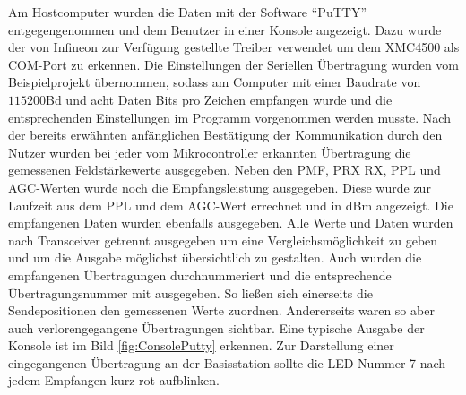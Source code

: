 Am Hostcomputer wurden die Daten mit der Software \enquote{PuTTY} entgegengenommen und dem Benutzer in einer Konsole angezeigt. Dazu wurde der von Infineon zur Verfügung gestellte Treiber verwendet um dem XMC4500 als COM-Port zu erkennen. %
Die Einstellungen der Seriellen Übertragung wurden vom Beispielprojekt übernommen, sodass am Computer mit einer Baudrate von $115200$Bd und acht Daten Bits pro Zeichen empfangen wurde und die entsprechenden Einstellungen im Programm vorgenommen werden musste. Nach der bereits erwähnten anfänglichen Bestätigung der Kommunikation durch den Nutzer wurden bei jeder vom Mikrocontroller erkannten   Übertragung die gemessenen Feldstärkewerte ausgegeben. Neben den PMF, PRX RX, PPL und AGC-Werten wurde noch die Empfangsleistung ausgegeben. Diese wurde zur Laufzeit aus dem PPL und dem AGC-Wert errechnet und in dBm angezeigt. Die empfangenen Daten wurden ebenfalls ausgegeben. 
Alle Werte und Daten wurden nach Transceiver getrennt ausgegeben um eine Vergleichsmöglichkeit zu geben und um die Ausgabe möglichst übersichtlich zu gestalten.
Auch wurden die empfangenen Übertragungen durchnummeriert und die entsprechende Übertragungsnummer mit ausgegeben. So ließen sich einerseits die Sendepositionen den gemessenen Werte zuordnen. Andererseits waren so aber auch  verlorengegangene  Übertragungen sichtbar. Eine typische Ausgabe der Konsole ist im Bild \ref{fig:ConsolePutty} erkennen. Zur Darstellung einer eingegangenen Übertragung an der Basisstation sollte die LED Nummer 7 nach jedem Empfangen kurz rot aufblinken. %



